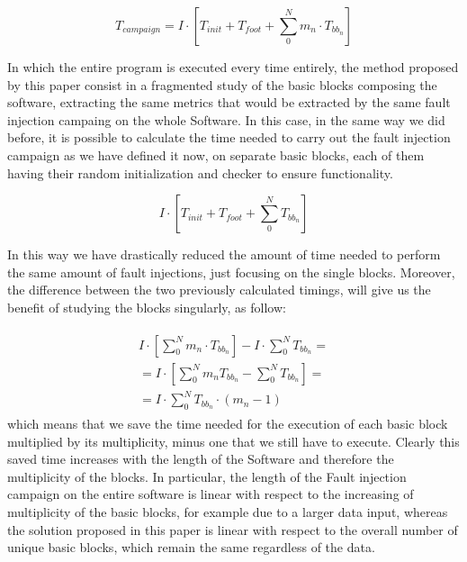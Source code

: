 \documentclass[./dissertation.tex]{subfiles}
\begin{document}
\begin{equation}
    T_{campaign} = I\cdot \left[ T_{init} + T_{foot} + \sum_0^N m_n \cdot T_{bb_n}     \right]
\end{equation}

In which the entire program is executed every time entirely, the method proposed by this paper consist in a fragmented study of the basic blocks composing the software, extracting the same metrics that would be extracted by the same fault injection campaing on the whole Software. In this case, in the same way we did before, it is possible to calculate the time needed to carry out the fault injection campaign as we have defined it now, on separate basic blocks, each of them having their random initialization and checker to ensure functionality.

\begin{equation}
 I \cdot \left[T_{init} + T_{foot} + \sum_0^N T_{bb_n} \right]    
\end{equation}

In this way we have drastically reduced the amount of time needed to perform the same amount of fault injections, just focusing on the single blocks. Moreover, the difference between the two previously calculated timings, will give us the benefit of studying the blocks singularly, as follow:

\begin{align}
    \begin{split}
     I \cdot \left[ \sum_0^N m_n \cdot T_{bb_n} \right] - I \cdot \sum_0^N T_{bb_n} = 
     \\ = I \cdot \left[ \sum_0^N m_n T_{bb_n}  - \sum_0^N T_{bb_n} \right]=
     \\ = I\cdot \sum_0^N T_{bb_n} \cdot ( m_n - 1)
    \end{split}
\end{align}
which means that we save the time needed for the execution of each basic block multiplied by its multiplicity, minus one that we still have to execute. Clearly this saved time increases with the length of the Software and therefore the multiplicity of the blocks. In particular, the length of the Fault injection campaign on the entire software is linear with respect to the increasing of multiplicity of the basic blocks, for example due to a larger data input, whereas the solution proposed in this paper is linear with respect to the overall number of unique basic blocks, which remain the same regardless of the data.
\end{document}
